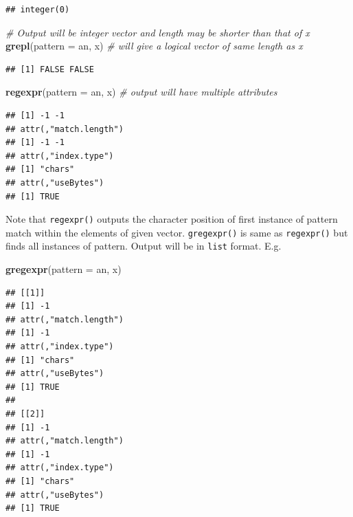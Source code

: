 \documentclass[
]{book}
\newenvironment{Shaded}{\begin{snugshade}}{\end{snugshade}}
\newcommand{\AttributeTok}[1]{\textcolor[rgb]{0.13,0.29,0.53}{#1}}
\newcommand{\CommentTok}[1]{\textcolor[rgb]{0.56,0.35,0.01}{\textit{#1}}}
\newcommand{\FunctionTok}[1]{\textcolor[rgb]{0.13,0.29,0.53}{\textbf{#1}}}
\newcommand{\NormalTok}[1]{#1}
\newcommand{\StringTok}[1]{\textcolor[rgb]{0.31,0.60,0.02}{#1}}
\begin{document}
\begin{verbatim}
## integer(0)
\end{verbatim}

\begin{Shaded}
\begin{Highlighting}[]
\CommentTok{\#                         Output will be integer vector and length may be shorter than that of \textasciigrave{}x\textasciigrave{}}
\FunctionTok{grepl}\NormalTok{(}\AttributeTok{pattern =} \StringTok{\textquotesingle{}an\textquotesingle{}}\NormalTok{, x) }\CommentTok{\# will give a logical vector of same length as \textasciigrave{}x\textasciigrave{}}
\end{Highlighting}
\end{Shaded}

\begin{verbatim}
## [1] FALSE FALSE
\end{verbatim}

\begin{Shaded}
\begin{Highlighting}[]
\FunctionTok{regexpr}\NormalTok{(}\AttributeTok{pattern =} \StringTok{\textquotesingle{}an\textquotesingle{}}\NormalTok{, x) }\CommentTok{\# output will have multiple attributes}
\end{Highlighting}
\end{Shaded}

\begin{verbatim}
## [1] -1 -1
## attr(,"match.length")
## [1] -1 -1
## attr(,"index.type")
## [1] "chars"
## attr(,"useBytes")
## [1] TRUE
\end{verbatim}

Note that \texttt{regexpr()} outputs the character position of first instance of pattern match within the elements of given vector.
\texttt{gregexpr()} is same as \texttt{regexpr()} but finds all instances of pattern. Output will be in \texttt{list} format. E.g.

\begin{Shaded}
\begin{Highlighting}[]
\FunctionTok{gregexpr}\NormalTok{(}\AttributeTok{pattern =} \StringTok{\textquotesingle{}an\textquotesingle{}}\NormalTok{, x)}
\end{Highlighting}
\end{Shaded}

\begin{verbatim}
## [[1]]
## [1] -1
## attr(,"match.length")
## [1] -1
## attr(,"index.type")
## [1] "chars"
## attr(,"useBytes")
## [1] TRUE
## 
## [[2]]
## [1] -1
## attr(,"match.length")
## [1] -1
## attr(,"index.type")
## [1] "chars"
## attr(,"useBytes")
## [1] TRUE
\end{verbatim}
\end{document}
